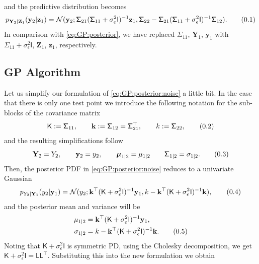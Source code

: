 \documentclass[10pt]{article}
\theoremstyle{definition}
\newcommand\eqnum{\addtocounter{equation}{1}\tag{\arabic{section}.\arabic{equation}}}
\begin{document}
and the predictive distribution becomes
\begin{equation*}
p_{\mathbf{Y}_2|\mathbf{Z}_1}(\mathbf{y}_2|\mathbf{z}_1) =
\mathcal{N}(\mathbf{y}_2; 
\mathsf{\Sigma}_{21}(\mathsf{\Sigma}_{11} + \sigma_{\epsilon}^2\mathsf{I})^{-1}\mathbf{z}_1, 
\mathsf{\Sigma}_{22} - \mathsf{\Sigma}_{21} (\mathsf{\Sigma}_{11}+\sigma_{\epsilon}^2\mathsf{I})^{-1} \mathsf{\Sigma}_{12}).
\eqnum
\label{eq:GP:posterior:noise}
\end{equation*}
In comparison with \cref{eq:GP:posterior}, we have replaced $\mathsf{\Sigma}_{11}$, $\mathbf{Y}_1$,  $\mathbf{y}_1$ with $\mathsf{\Sigma}_{11}+\sigma_{\epsilon}^2\mathsf{I}$,  $\mathbf{Z}_1$, $\mathbf{z}_1$, respectively.

\subsection{GP Algorithm}
Let us simplify our formulation of \cref{eq:GP:posterior:noise} a little bit. In the case that there is only one test point we introduce the following notation for the sub-blocks of the covariance matrix
\begin{equation*}
\mathsf{K}:=\mathsf{\Sigma}_{11} ,  \qquad
\mathbf{k}:=\mathsf{\Sigma}_{12}  =\mathsf{\Sigma}_{21}^{\top}, \qquad
k := \mathsf{\Sigma}_{22},
\eqnum
\end{equation*}
and the resulting simplifications follow
\begin{equation*}
\mathbf{Y}_2 = Y_2, \qquad
\mathbf{y}_2 = y_2, \qquad
\boldsymbol{\mu}_{1|2} = \mu_{1|2} \qquad
\mathsf{\Sigma}_{1|2} = \sigma_{1|2}.
\eqnum
\end{equation*}
Then, the posterior PDF in \cref{eq:GP:posterior:noise} reduces to a univariate Gaussian
\begin{equation*}
p_{Y_2|\mathbf{Y}_1}(y_2|\mathbf{y}_1) = 
\mathcal{N}(y_2; \mathbf{k}^{\top}(\mathsf{K} + \sigma_{\epsilon}^2\mathsf{I})^{-1}\mathbf{y}_1, k - 
\mathbf{k}^{\top} (\mathsf{K}+\sigma_{\epsilon}^2\mathsf{I})^{-1} \mathbf{k}),
\eqnum
\label{eq:GP:posterior:single}
\end{equation*}
and the posterior mean and variance will be
\begin{align*}
\mu_{1|2}  &= \mathbf{k}^{\top}(\mathsf{K}+\sigma_{\epsilon}^2\mathsf{I})^{-1}\mathbf{y}_1, \\
\sigma_{1|2} &= k - \mathbf{k}^{\top} (\mathsf{K}+\sigma_{\epsilon}^2\mathsf{I})^{-1} \mathbf{k}.
\eqnum
\end{align*}
Noting that $\mathsf{K}+\sigma_{\epsilon}^2\mathsf{I}$ is symmetric PD, using the Cholesky decomposition, we get $\mathsf{K}+\sigma_{\epsilon}^2\mathsf{I}=\mathsf{L}\mathsf{L}^{\top}$. Substituting this into the new formulation we obtain
\end{document}
